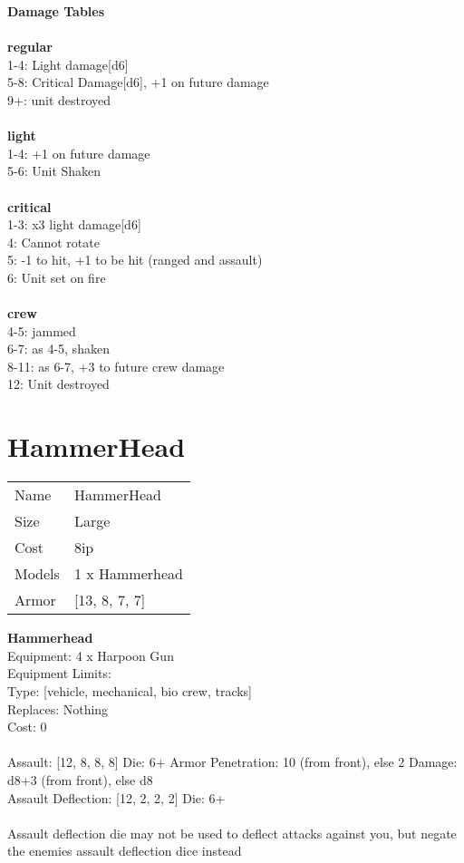 {\bf Damage Tables} \\
\ \\ {\bf regular } \\
1-4: Light damage[d6] \\
5-8: Critical Damage[d6], +1 on future damage \\
9+: unit destroyed \\
\ \\ {\bf light } \\
1-4: +1 on future damage \\
5-6: Unit Shaken \\
\ \\ {\bf critical } \\
1-3: x3 light damage[d6] \\
4: Cannot rotate \\
5: -1 to hit, +1 to be hit (ranged and assault) \\
6: Unit set on fire \\
\ \\ {\bf crew } \\
4-5: jammed \\
6-7: as 4-5, shaken \\
8-11: as 6-7, +3 to future crew damage \\
12: Unit destroyed \\










\pagebreak\pagebreak

\section{ HammerHead }

\begin{tabular}{ll}
  Name & HammerHead \\
  Size & Large\\
  Cost & 8ip\\
  Models & 1 x Hammerhead\\
  Armor & [13, 8, 7, 7]\\
\end{tabular}

\noindent 

{\bf Hammerhead } \\
Equipment: 4 x Harpoon Gun \\
Equipment Limits:  \\
Type: [vehicle, mechanical, bio crew, tracks] \\
Replaces: Nothing \\
Cost: 0\\
\ \\
Assault: [12, 8, 8, 8] Die: 6+ Armor Penetration: 10 (from front), else 2 Damage: d8+3 (from front), else d8 \\
Assault Deflection: [12, 2, 2, 2] Die: 6+\\
\\ 
Assault deflection die may not be used to deflect attacks against you, but negate the enemies assault deflection dice instead\\ 
 
